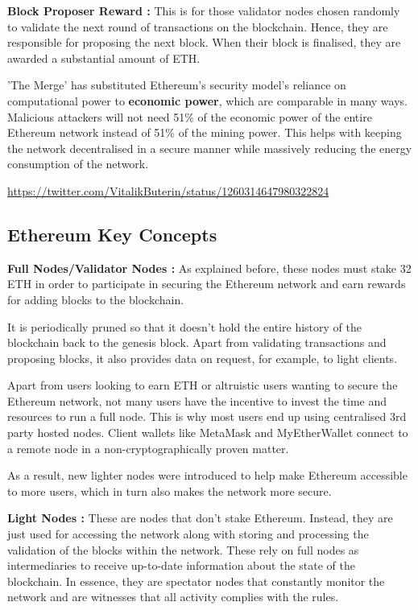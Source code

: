 \textbf{Block Proposer Reward :}
This is for those validator nodes chosen randomly to validate the next round of transactions on the blockchain. Hence, they are responsible for proposing the next block. When their block is finalised, they are awarded a substantial amount of ETH.


'The Merge' has substituted Ethereum's security model's reliance on computational power to \textbf{economic power}, which are comparable in many ways. Malicious attackers will not need 51\% of the economic power of the entire Ethereum network instead of 51\% of the mining power. This helps with keeping the network decentralised in a secure manner while massively reducing the energy consumption of the network. 

\url{https://twitter.com/VitalikButerin/status/1260314647980322824}



\subsection{Ethereum Key Concepts}

\textbf{Full Nodes/Validator Nodes :}
As explained before, these nodes must stake 32 ETH in order to participate in securing the Ethereum network and earn rewards for adding blocks to the blockchain.

It is periodically pruned so that it doesn't hold the entire history of the blockchain back to the genesis block. Apart from validating transactions and proposing blocks, it also provides data on request, for example, to light clients.

Apart from users looking to earn ETH or altruistic users wanting to secure the Ethereum network, not many users have the incentive to invest the time and resources to run a full node. This is why most users end up using centralised 3rd party hosted nodes. Client wallets like MetaMask and MyEtherWallet connect to a remote node in a non-cryptographically proven matter. 

As a result, new lighter nodes were introduced to help make Ethereum accessible to more users, which in turn also makes the network more secure.

\textbf{Light Nodes :}
These are nodes that don't stake Ethereum. Instead, they are just used for accessing the network along with storing and processing the validation of the blocks within the network. These rely on full nodes as intermediaries to receive up-to-date information about the state of the blockchain. In essence, they are spectator nodes that constantly monitor the network and are witnesses that all activity complies with the rules.

